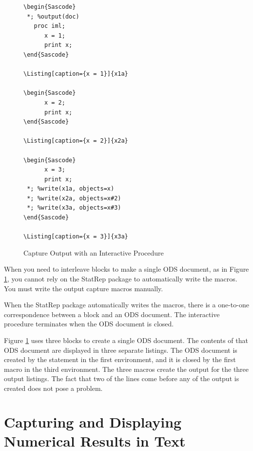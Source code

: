 \documentclass[article,oneside]{memoir}
\newcommand*{\StatRep}{\textsf{StatRep}\xspace}
\begin{document}
\begin{figure}[H]
\begin{snugshade}
\begin{verbatim}
\begin{Sascode}
 *; %output(doc)
   proc iml;
      x = 1;
      print x;
\end{Sascode}

\Listing[caption={x = 1}]{x1a}

\begin{Sascode}
      x = 2;
      print x;
\end{Sascode}

\Listing[caption={x = 2}]{x2a}

\begin{Sascode}
      x = 3;
      print x;
 *; %write(x1a, objects=x)
 *; %write(x2a, objects=x#2)
 *; %write(x3a, objects=x#3)
\end{Sascode}

\Listing[caption={x = 3}]{x3a}
\end{verbatim}
\end{snugshade}
\caption{Capture Output with an Interactive Procedure}\label{interact}
\end{figure}

  When you need to interleave  blocks to make a single ODS
  document, as in Figure \ref{interact}, you cannot rely on the \StatRep package to
  automatically write the macros. You must write the output capture macros manually.

  When the \StatRep package automatically writes the macros, there is a
  one-to-one correspondence between a  block and an ODS document.
  The interactive procedure terminates when the ODS document is closed.

  Figure \ref{interact} uses three  blocks to create a single ODS document.
  The contents of that ODS document are displayed in three separate listings.
  The ODS document is created by the  statement in the first
   environment, and it is closed by the first 
  macro in the third  environment.
  The three  macros create the output for the
  three output listings.
  The fact that two of the  lines come before any of the output is
  created does not pose a problem.

\section{Capturing and Displaying Numerical Results in Text}
\end{document}
